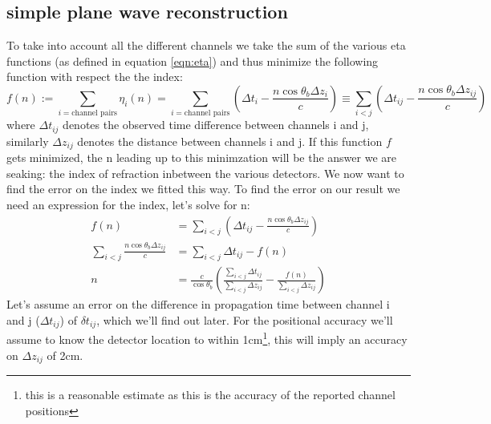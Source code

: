 \subsection{simple plane wave reconstruction}
\label{seq:SimplePW}
To take into account all the different channels we take the sum of the
various eta functions (as defined in equation \ref{eqn:eta}) and
thus minimize the following function with respect the the index:
\begin{equation}
	f(n) := \sum_{i=\text{channel pairs}}\eta_i(n) = \sum_{i=\text{channel pairs}}\left( \Delta t_i - \frac{n\cos\theta_b \Delta z_i}{c}\right) \equiv \sum_{i<j}\left( \Delta t_{ij} - \frac{n\cos\theta_b \Delta z_{ij}}{c}\right)
  	\label{eqn:PlaneWave}
\end{equation}
where $\Delta t_{ij}$ denotes the observed time difference between
channels i and j, similarly $\Delta z_{ij}$ denotes the distance
between channels i and j.
If this function $f$ gets minimized, the n leading up to this minimzation
will be the answer we are seaking: the index of refraction inbetween
the various detectors.  
We now want to find the error on the index we fitted this way. To find the error on our result we need an expression for the index, let's solve for n:
\begin{align}
	f(n) &= \sum_{i<j}\left( \Delta t_{ij} - \frac{n\cos\theta_b \Delta z_{ij}}{c}\right)\\
\sum_{i<j}\frac{n\cos\theta_b \Delta z_{ij}}{c}&=\sum_{i<j}\Delta t_{ij} - f(n)\\
	n &= \frac{c}{\cos\theta_b}\left(\frac{\sum_{i<j}\Delta t_{ij}}{\sum_{i<j} \Delta z_{ij}} - \frac{f(n)}{\sum_{i<j} \Delta z_{ij}}\right)
\end{align}
Let's assume an error on the difference in propagation time between channel i and j
($\Delta t_{ij}$) of $\delta t_{ij}$, which we'll find out later.  For the
positional accuracy we'll assume to know the detector location to within 1cm\footnote{this
is a reasonable estimate as this is the accuracy of the reported channel positions},
this will imply an accuracy on $\Delta z_{ij}$ of 2cm.

